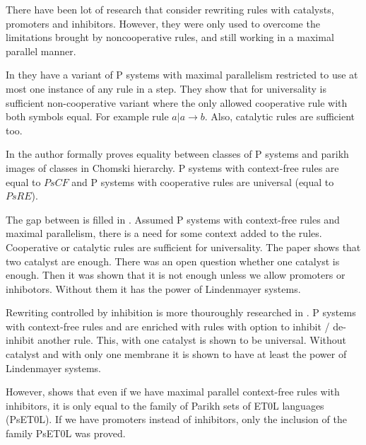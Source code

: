 \documentclass[a4paper,10pt]{article}
\begin{document}

There have been lot of research that consider rewriting rules with catalysts, promoters and inhibitors. However, they were only used to overcome the limitations brought by noncooperative rules, and still working in a maximal parallel manner.


In \cite{Ibarra04dang:the} they have a variant of P systems with maximal parallelism restricted to use at most one instance of any rule in a step.
They show that for universality is sufficient non-cooperative variant where the only allowed cooperative rule with both symbols equal. For example rule $a|a\rightarrow b$. Also, catalytic rules are sufficient too.


In \cite{Sburlan05dragos} the author formally proves equality between classes of P systems and parikh images of classes in Chomski hierarchy. P systems with context-free rules are equal to $PsCF$ and P systems with cooperative rules are universal (equal to $PsRE$).


The gap between is filled in \cite{Ionescu:jucs_10_5:on_p_systems_with}. Assumed P systems with context-free rules and maximal parallelism, there is a need for some context added to the rules. Cooperative or catalytic rules are sufficient for universality. The paper shows that two catalyst are enough. There was an open question whether one catalyst is enough. Then it was shown that it is not enough unless we allow promoters or inhibotors. Without them it has the power of Lindenmayer systems.


Rewriting controlled by inhibition is more thouroughly researched in \cite{Cavaliere:2004:IRP:2144633.2144648}. P systems with context-free rules and are enriched with rules with option to inhibit / de-inhibit another rule. This, with one catalyst is shown to be universal. Without catalyst and with only one membrane it is shown to have at least the power of Lindenmayer systems.


However, \cite{doi:10.1142/S0129054106003772} shows that even if we have maximal parallel context-free rules with inhibitors, it is only equal to the family of Parikh sets of ET0L languages (PsET0L). If we have promoters instead of inhibitors, only the inclusion of the family PsET0L was proved. %
\end{document}
